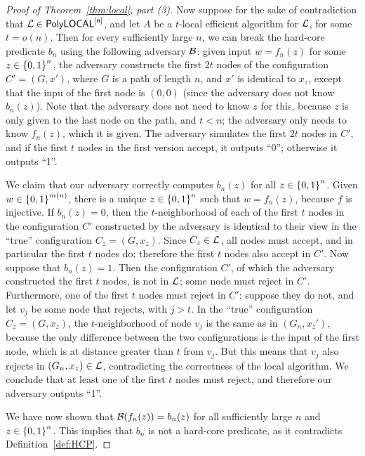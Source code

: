 \begin{proof}[Proof of Theorem~\ref{thm:local}, part (3)]
	Now suppose for the sake of contradiction that $\mathcal{L} \in \mathsf{PolyLOCAL}^{[\mathsf{n}]}$,
	and let $A$ be a $t$-local efficient algorithm for $\mathcal{L}$, for some $t = o(n)$.
	Then for every sufficiently large $n$, 
	we can break the hard-core predicate $b_n$ using the following adversary $\mathcal{B}$:
	given input $w = f_n(z)$ for some $z \in \left \{{0,1} \right \}^n$,
	the adversary constructs the first $2t$ nodes of the configuration $C' = (G, x')$,
	where $G$ is a path of length $n$,
	and $x'$ is identical to $x_z$,
	except that the inpu of the first node is $(0, 0)$ (since the adversary does not know $b_n(z)$).
	Note that the adversary does not need to know $z$ for this, because $z$ is only given to the last node
	on the path, and $t < n$; the adversary only needs to know $f_n(z)$, which it is given.
	The adversary simulates the first $2t$ nodes in $C'$,
	and
	if the first $t$ nodes in the first version accept, it outputs ``0'';
	otherwise it outputs ``1''.

	We claim that our adversary correctly computes $b_n(z)$ for all $z \in \left \{{0,1} \right \}^n$.
	Given $w \in \left \{{0,1} \right \}^{m(n)}$, there is a unique $z \in \left \{{0,1} \right \}^n$ such that $w = f_n(z)$, because $f$ is injective.
	If $b_n(z) = 0$,
	then the $t$-neighborhood
	of each of the first $t$ nodes in the configuration $C'$ constructed by the adversary is identical
	to their view in the ``true'' configuration $C_z = (G, x_z)$.
	Since $C_z \in \mathcal{L}$, all nodes must accept, and in particular the first $t$ nodes do;
	therefore the first $t$ nodes also accept in $C'$.
	Now suppose that $b_n(z) = 1$.
	Then the configuration $C'$,
	of which the adversary constructed the first $t$ nodes,
	is not in $\mathcal{L}$; some node must reject in $C'$.
	Furthermore, one of the first $t$ nodes must reject in $C'$:
	suppose they do not, and let $v_j$ be some node that rejects, with $j > t$.
	In the ``true'' configuration $C_z = (G, x_z)$, the $t$-neighborhood of node $v_j$
	is the same as in $(G_n, x_z')$, because the only difference between the two configurations is the input
	of the first node, which is at distance greater than $t$ from $v_j$.
	But this means that $v_j$ also rejects in $(G_n, x_z) \in \mathcal{L}$, contradicting the correctness of the local algorithm.
	We conclude that at least one of the first $t$ nodes must reject, and therefore our adversary outputs ``1''.

	We have now shown that $\mathcal{B}(f_n(z)) = b_n(z)$ for all sufficiently large $n$ and $z \in \left \{{0,1} \right \}^n$.
	This implies that $b_n$ is not a hard-core predicate, as it contradicts Definition~\ref{def:HCP}.
\end{proof}
